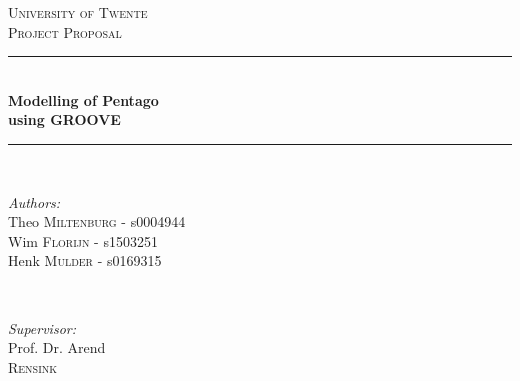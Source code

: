 \begin{titlepage}

\newcommand{\HRule}{\rule{\linewidth}{0.5mm}} %

\center %
 

\textsc{\LARGE University of Twente}\\[1.5cm] %
\textsc{\Large Project Proposal}\\[0.5cm] %


\HRule \\[0.4cm]
{ \huge \bfseries Modelling of Pentago}\\[0.4cm] %
\vspace{-1mm}
{ \huge \bfseries using GROOVE}\\[0.4cm] %
\HRule \\[1.5cm]
 

\begin{minipage}[t]{0.5\linewidth}
\begin{flushleft} \large
\emph{Authors:}\\
Theo \textsc{Miltenburg }  -  s0004944\\ %
Wim \textsc{Florijn}   - s1503251\\%
Henk \textsc{Mulder}   - s0169315%
\end{flushleft}
\end{minipage}
~
\begin{minipage}[t]{0.42\linewidth}
\begin{flushright} \large
\emph{Supervisor:} \\
Prof. Dr. Arend \\
\textsc{Rensink}%
\end{flushright}
\end{minipage}\\[2cm]


\end{titlepage}
